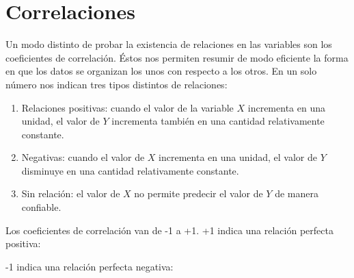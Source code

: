 \documentclass[a4paper,12pt]{article}
\begin{document}
\section{Correlaciones}\label{correlaciones}

Un modo distinto de probar la existencia de relaciones en las variables son los coeficientes de correlación. Éstos nos permiten resumir de modo eficiente la forma en que los datos se organizan los unos con respecto a los otros. En un solo número nos indican tres tipos distintos de relaciones:

\begin{enumerate}
  \item Relaciones positivas: cuando el valor de la variable $X$ incrementa en una unidad, el valor de $Y$ incrementa también en una cantidad relativamente constante.
  \item Negativas: cuando el valor de $X$ incrementa en una unidad, el valor de $Y$ disminuye en una cantidad relativamente constante.
  \item Sin relación: el valor de $X$ no permite predecir el valor de $Y$ de manera confiable.
\end{enumerate}

Los coeficientes de correlación van de -1 a +1. +1 indica una relación perfecta positiva:

\begin{figure}[!ht]
  \begin{center}
  \end{center}
\end{figure}

-1 indica una relación perfecta negativa:
\end{document}
